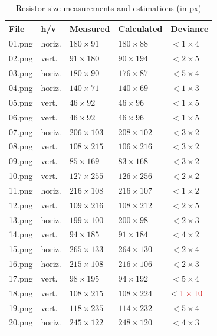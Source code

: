 \documentclass[10pt,twocolumn,letterpaper]{article}
\begin{document}
\begin{table}[H]
\centering
\begin{tabular}{l|l|l|l|l}
		File & h/v & Measured & Calculated & Deviance\\ \hline
		01.png & horiz. & $180\times91$ & $180\times88$ & $<1\times4$ \\ \hline
		02.png & vert. & $91\times180$ & $90\times194$ & $<2\times5$ \\ \hline
		03.png & horiz. & $180\times90$ & $176\times87$ & $<5\times4$ \\ \hline
		04.png & horiz. & $140\times71$ & $140\times69$ & $<1\times3$ \\ \hline
		05.png & vert. & $46\times92$ & $46\times96$ & $<1\times5$ \\ \hline
		06.png & vert. & $46\times92$ & $46\times96$ & $<1\times5$ \\ \hline
		07.png & horiz. & $206\times103$ & $208\times102$ & $<3\times2$ \\ \hline
		08.png & vert. & $108\times215$ & $106\times216$ & $<3\times2$ \\ \hline
		09.png & vert. & $85\times169$ & $83\times168$ & $<3\times2$ \\ \hline
		10.png & vert. & $127\times255$ & $126\times256$ & $<2\times2$ \\ \hline
		11.png & horiz. & $216\times108$ & $216\times107$ & $<1\times2$ \\ \hline
		12.png & vert. & $109\times216$ & $108\times212$ & $<2\times5$ \\ \hline
		13.png & horiz. & $199\times100$ & $200\times98$ & $<2\times3$ \\ \hline
		14.png & vert. & $94\times185$ & $91\times184$ & $<4\times2$ \\ \hline
		15.png & horiz. & $265\times133$ & $264\times130$ & $<2\times4$ \\ \hline
		16.png & horiz. & $215\times108$ & $216\times106$ & $<2\times3$ \\ \hline
		17.png & vert. & $98\times195$ & $94\times192$ & $<5\times4$ \\ \hline
		18.png & vert. & $108\times215$ & $108\times224$ & $<\textcolor[rgb]{0.8,0,0}{1\times10}$ \\ \hline
		19.png & vert. & $118\times235$ & $114\times232$ & $<5\times4$ \\ \hline
		20.png & horiz. & $245\times122$ & $248\times120$ & $<4\times3$ \\ \hline
\end{tabular}
\caption{Resistor size measurements and estimations (in px)}
\label{tab:resdim}
\end{table}
\par
\end{document}
